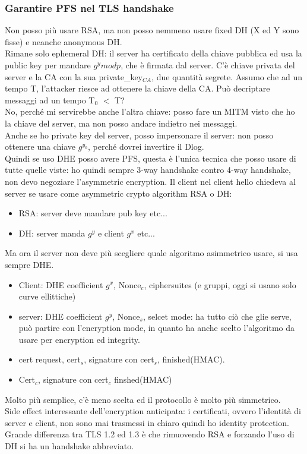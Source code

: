 \documentclass[16px]{article}
\begin{document}
\subsubsection{Garantire PFS nel TLS handshake}
Non posso più usare RSA, ma non posso nemmeno usare fixed DH (X ed Y sono fisse) e neanche anonymous DH.\\ Rimane solo ephemeral DH: il server ha certificato della chiave pubblica ed usa la public key per mandare $g^ymodp$, che è firmata dal server. C'è chiave privata del server e la CA con la sua private\_key$_{CA}$, due quantità segrete. Assumo che ad un tempo T, l'attacker riesce ad ottenere la chiave della CA. Può decriptare messaggi ad un tempo T$_0$ $<$ T?\\ No, perché mi servirebbe anche l'altra chiave: posso fare un MITM visto che ho la chiave del server, ma non posso andare indietro nei messaggi.\\ Anche se ho private key del server, posso impersonare il server: non posso ottenere una chiave $g^{y_0}$, perché dovrei invertire il Dlog.\\ Quindi se uso DHE posso avere PFS, questa è l'unica tecnica che posso usare di tutte quelle viste: ho quindi sempre 3-way handshake contro 4-way handshake, non devo negoziare l'asymmetric encryption. Il client nel client hello chiedeva al server se usare come asymmetric crypto algorithm RSA o DH:
\begin{itemize}
\item RSA: server deve mandare pub key etc...
\item DH: server manda $g^y$ e client $g^x$ etc...
\end{itemize}
Ma ora il server non deve più scegliere quale algoritmo asimmetrico usare, si usa sempre DHE.
\begin{itemize}
\item Client: DHE coefficient $g^x$, Nonce$_c$, ciphersuites (e gruppi, oggi si usano solo curve ellittiche)
\item server: DHE coefficient $g^y$, Nonce$_s$, selcet mode: ha tutto ciò che glie serve, può partire con l'encryption mode, in quanto ha anche scelto l'algoritmo da usare per encryption ed integrity.
\item cert request, cert$_s$, signature con cert$_s$, finished(HMAC). 
\item Cert$_c$, signature con cert$_c$ finshed(HMAC)
\end{itemize}
Molto più semplice, c'è meno scelta ed il protocollo è molto più simmetrico.\\ Side effect interessante dell'encryption anticipata: i certificati, ovvero l'identità di server e client, non sono mai trasmessi in chiaro quindi ho identity protection.\\ Grande differenza tra TLS 1.2 ed 1.3 è che rimuovendo RSA e forzando l'uso di DH si ha un handshake abbreviato.
\end{document}

